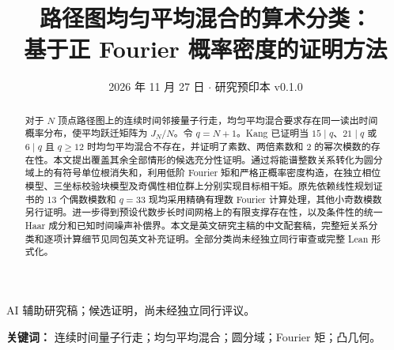 \documentclass[UTF8,fontset=none,11pt]{ctexart}
\title{\vspace{-1.2em}\bfseries 路径图均匀平均混合的算术分类：\\基于正 Fourier 概率密度的证明方法}
\author{}\date{2026 年 11 月 27 日 \quad $\cdot$ \quad 研究预印本 v0.1.0}
\begin{document}
\maketitle
\begin{center}\small AI 辅助研究稿；候选证明，尚未经独立同行评议。\end{center}
\begin{abstract}
对于 $N$ 顶点路径图上的连续时间邻接量子行走，均匀平均混合要求存在同一读出时间概率分布，使平均跃迁矩阵为 $J_N/N$。令 $q=N+1$。Kang 已证明当 $15\mid q$、$21\mid q$ 或 $6\mid q$ 且 $q\ge12$ 时均匀平均混合不存在，并证明了素数、两倍素数和 2 的幂次模数的存在性。本文提出覆盖其余全部情形的候选充分性证明。通过将能谱整数关系转化为圆分域上的有符号单位根消失和，利用低阶 Fourier 矩和严格正概率密度构造，在独立相位模型、三坐标校验块模型及奇偶性相位群上分别实现目标相干矩。原先依赖线性规划证书的 13 个偶数模数和 $q=33$ 现均采用精确有理数 Fourier 计算处理，其他小奇数模数另行证明。进一步得到预设代数步长时间网格上的有限支撑存在性，以及条件性的统一 Haar 成分和已知时间噪声补偿界。本文是英文研究主稿的中文配套稿，完整短关系分类和逐项计算细节见同包英文补充证明。全部分类尚未经独立同行审查或完整 Lean 形式化。
\end{abstract}
\noindent\textbf{关键词：} 连续时间量子行走；均匀平均混合；圆分域；Fourier 矩；凸几何。
\end{document}
